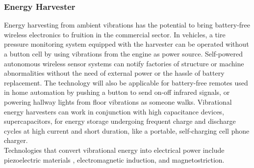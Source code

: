 \subsubsection{Energy Harvester}
Energy harvesting from ambient vibrations has the potential to bring battery-free wireless electronics to fruition in the commercial sector. In vehicles, a tire pressure monitoring system equipped with the harvester can be operated without a button cell by using vibrations from the engine as power source. Self-powered autonomous wireless sensor systems can notify factories of structure or machine abnormalities without the need of external power or the hassle of battery replacement. The technology will also be applicable for battery-free remotes used in home automation by pushing a button to send on-off infrared signals, or powering hallway lights from floor vibrations as someone walks. Vibrational energy harvesters can work in conjunction with high capacitance devices, supercapacitors, for energy storage undergoing frequent charge and discharge cycles at high current and short duration, like a portable, self-charging cell phone charger.\\ Technologies that convert vibrational energy into electrical power include piezoelectric materials \cite{Gonzalez2002}, electromagnetic induction\cite{Saha2008}, and magnetostriction\cite{Ueno2011}. 


